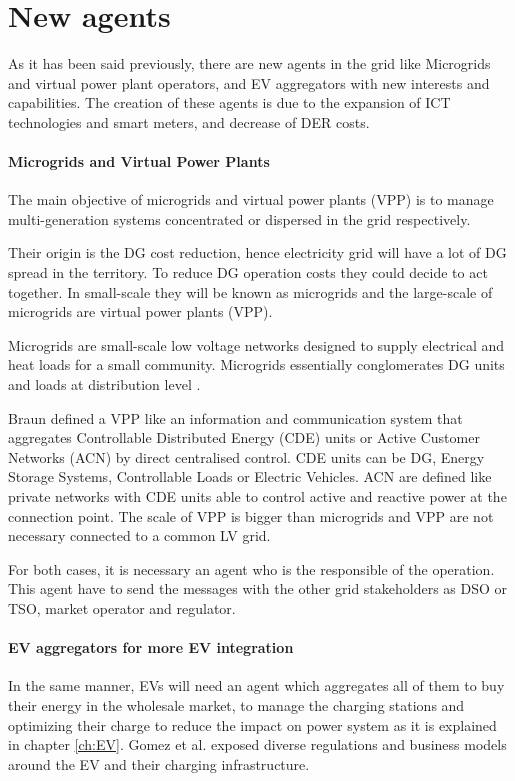 \documentclass[a4paper,11pt,twoside,openright]{report}
\begin{document}
\section{New agents}
\label{sec:SoA3}
As it has been said previously, there are new agents in the grid like Microgrids and virtual power plant operators, and EV aggregators with new interests and capabilities. The creation of these agents is due to the expansion of ICT technologies and smart meters, and decrease of DER costs.

\paragraph{Microgrids and Virtual Power Plants}
The main objective of microgrids and virtual power plants (VPP) is to manage multi-generation systems concentrated or dispersed in the grid respectively.

Their origin is the DG cost reduction, hence electricity grid will have a lot of DG spread in the territory. To reduce DG operation costs they could decide to act together. In small-scale they will be known as microgrids and the large-scale of microgrids are virtual power plants (VPP).

Microgrids are small-scale low voltage networks designed to supply electrical and heat loads for a small community. Microgrids essentially conglomerates DG units and loads at distribution level \cite{Chowdhury}.

Braun \cite{braun2009provision} defined a VPP like an information and communication system that aggregates Controllable Distributed Energy (CDE) units or Active Customer Networks (ACN) by direct centralised control. CDE units can be DG, Energy Storage Systems, Controllable Loads or Electric Vehicles. ACN are defined like private networks with CDE units able to control active and reactive power at the connection point. The scale of VPP is bigger than microgrids and VPP are not necessary connected to a common LV grid. 

For both cases, it is necessary an agent who is the responsible of the operation. This agent have to send the messages with the other grid stakeholders as DSO or TSO, market operator and regulator.

\paragraph{EV aggregators for more EV integration}
In the same manner, EVs will need an agent which aggregates all of them to buy their energy in the wholesale market, to manage the charging stations and optimizing their charge to reduce the impact on power system as it is explained in chapter \ref{ch:EV}. Gomez et al. \cite{Gomez} exposed diverse regulations and business models around the EV and their charging infrastructure.
\end{document}
